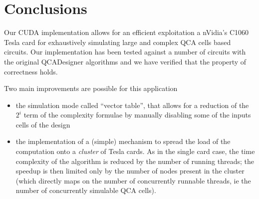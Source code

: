 \chapter{Conclusions}\label{sec:conclusions}
Our CUDA implementation allows for an efficient exploitation a nVidia's C1060 Tesla card for exhaustively simulating large and complex QCA cells based circuits. Our implementation has been tested against a number of circuits with the original QCADesigner algorithms and we have verified that the property of correctness holds.
 
Two main improvements are possible for this application
\begin{itemize}
\item the simulation mode called ``vector table'', that allows for a reduction of the $2^i$ term of the complexity formulae by manually disabling some of the inputs cells of the design
\item the implementation of a (simple) mechanism to spread the load of the computation onto a \textsl{cluster} of Tesla cards. As in the single card case, the time complexity of the algorithm is reduced by the number of running threads; the speedup is then limited only by the number of nodes present in the cluster (which directly maps on the number of concurrently runnable threads, ie the number of concurrently simulable QCA cells). 
\end{itemize}
